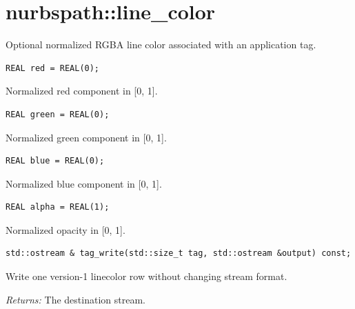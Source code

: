 \section{nurbspath::line\_color}
Optional normalized RGBA line color associated with an application tag.
\par\noindent\begin{minipage}{\linewidth}
\begin{lstlisting}[style=apireference]
REAL red = REAL(0);
\end{lstlisting}
{\footnotesize Normalized red component in [0, 1].\par}
\end{minipage}\par\vspace{1pt}
\par\noindent\begin{minipage}{\linewidth}
\begin{lstlisting}[style=apireference]
REAL green = REAL(0);
\end{lstlisting}
{\footnotesize Normalized green component in [0, 1].\par}
\end{minipage}\par\vspace{1pt}
\par\noindent\begin{minipage}{\linewidth}
\begin{lstlisting}[style=apireference]
REAL blue = REAL(0);
\end{lstlisting}
{\footnotesize Normalized blue component in [0, 1].\par}
\end{minipage}\par\vspace{1pt}
\par\noindent\begin{minipage}{\linewidth}
\begin{lstlisting}[style=apireference]
REAL alpha = REAL(1);
\end{lstlisting}
{\footnotesize Normalized opacity in [0, 1].\par}
\end{minipage}\par\vspace{1pt}
\par\noindent\begin{minipage}{\linewidth}
\begin{lstlisting}[style=apireference]
std::ostream & tag_write(std::size_t tag, std::ostream &output) const;
\end{lstlisting}
{\footnotesize Write one version-1 linecolor row without changing stream format.\par}
{\footnotesize\textit{Returns:} The destination stream.\par}
\end{minipage}\par\vspace{1pt}
